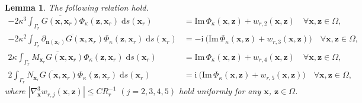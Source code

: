 \documentclass[10pt,a4paper]{article}
\numberwithin{equation}{section}
\newtheorem{lemma}[theorem]{Lemma}
\begin{document}
\begin{lemma}
  \label{lem:asymptotic-2}
  The following relation hold.
     \begin{align}
       \label{eq:asy-3}
    -2 \kappa^{3}\int_{ \Gamma_{r} }\overline{ G(\bm{ x },\bm{ x }_r)}\Phi_{\kappa}(\bm{ z },\bm{ x }_r) \;\mathrm{d}s(\bm{ x }_r)
     & =  \mathrm{Im}\, \Phi_{\kappa} (\bm{ x }, \bm{ z }) + w_{r,2} (\bm{ x }, \bm{ z }) \quad \forall  \bm{ x }, \bm{ z } \in  \Omega,\\
       \label{eq:asy-4}
    -2 \kappa^{2}\int_{ \Gamma_{r} }\overline{ \partial_{\bm{n}(\bm{ x }_r) } G(\bm{ x },\bm{ x }_r)}\Phi_{\kappa}(\bm{ z },\bm{ x }_r) \;\mathrm{d}s(\bm{ x }_r)
     & =  -\mathrm{ i }~ \big( \mathrm{Im}\, \Phi_{\kappa} (\bm{ x }, \bm{ z }) + w_{r,3} (\bm{ x }, \bm{ z }) \big) \quad \forall  \bm{ x }, \bm{ z } \in  \Omega,\\
       \label{eq:asy-5}
    2 \kappa\int_{ \Gamma_{r} }\overline{M_{\bm{ x }_r} G(\bm{ x },\bm{ x }_r)}\Phi_{\kappa}(\bm{ z },\bm{ x }_r) \;\mathrm{d}s(\bm{ x }_r)
     & =  \mathrm{Im}\, \Phi_{\kappa} (\bm{ x }, \bm{ z }) + w_{r,4} (\bm{ x }, \bm{ z }) \quad \forall  \bm{ x }, \bm{ z } \in  \Omega,\\
              \label{eq:asy-6}
    2\int_{ \Gamma_{r} }\overline{N_{\bm{ x }_r} G(\bm{ x },\bm{ x }_r)}\Phi_{\kappa}(\bm{ z },\bm{ x }_r) \;\mathrm{d}s(\bm{ x }_r)
     & =  \mathrm{ i } ~ \big( \mathrm{Im}\, \Phi_{\kappa} (\bm{ x }, \bm{ z }) + w_{r,5} (\bm{ x }, \bm{ z }) \big) \quad \forall  \bm{ x }, \bm{ z } \in  \Omega,
     \end{align}
      where $|\nabla_{\bm{ x }}^3w_{r,j}( \bm{ x }, \bm{ z })|\leq C R_{r}^{-1}$ $(j=2,3,4,5)$  hold uniformly for any $\bm{ x }$, $\bm{ z }\in \Omega$.
\end{lemma}
\end{document}
